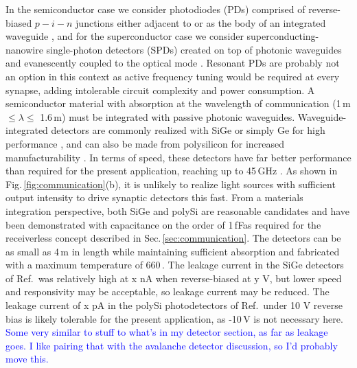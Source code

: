 \documentclass[twocolumn]{article}
\begin{document}
In the semiconductor case we consider photodiodes (PDs) comprised of reverse-biased $p-i-n$ junctions either adjacent to or as the body of an integrated waveguide \cite{orma2012,derose2011ultra,meor2014}, and for the superconductor case we consider superconducting-nanowire single-photon detectors (SPDs) created on top of photonic waveguides and evanescently coupled to the optical mode \cite{spga2011,pesc2012,feka2015,saga2015,shbu2017b,buta2020}. Resonant PDs are probably not an option in this context as active frequency tuning would be required at every synapse, adding intolerable circuit complexity and power consumption. A semiconductor material with absorption at the wavelength of communication (1\,\textmu m $\le \lambda \le$ 1.6\,\textmu m) must be integrated with passive photonic waveguides. Waveguide-integrated detectors are commonly realized with SiGe or simply Ge for high performance \cite{derose2011ultra}, and can also be made from polysilicon for increased manufacturability \cite{meor2014}. In terms of speed, these detectors have far better performance than required for the present application, reaching up to 45\,GHz \cite{derose2011ultra}. As shown in Fig.\,\ref{fig:communication}(b), it is unlikely to realize light sources with sufficient output intensity to drive synaptic detectors this fast. From a materials integration perspective, both SiGe and polySi are reasonable candidates and have been demonstrated with capacitance on the order of 1\,fF\textemdash as required for the receiverless concept described in Sec.\,\ref{sec:communication}. The detectors can be as small as 4\,\textmu m in length while maintaining sufficient absorption and fabricated with a maximum temperature of 660\,\textcelsius \cite{derose2011ultra}. The leakage current in the SiGe detectors of Ref.\,\cite{} was relatively high at x nA when reverse-biased at y V, but lower speed and responsivity may be acceptable, so leakage current may be reduced. The leakage current of x pA in the polySi photodetectors of Ref.\,\cite{derose2011ultra} under 10 V reverse bias is likely tolerable for the present application, as -10\,V is not necessary here. \textcolor{blue}{Some very similar to stuff to what's in my detector section, as far as leakage goes. I like pairing that with the avalanche detector discussion, so I'd probably move this.}
\end{document}
